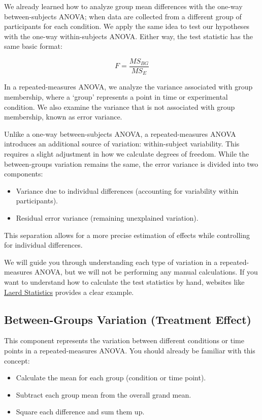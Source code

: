 \documentclass[
  letterpaper,
  DIV=11,
  numbers=noendperiod]{scrreprt}
\begin{document}
We already learned how to analyze group mean differences with the
one-way between-subjects ANOVA; when data are collected from a different
group of participants for each condition. We apply the same idea to test
our hypotheses with the one-way within-subjects ANOVA. Either way, the
test statistic has the same basic format:

\[
F = \frac{MS_{BG}}{MS_E}
\]

In a repeated-measures ANOVA, we analyze the variance associated with
group membership, where a `group' represents a point in time or
experimental condition. We also examine the variance that is not
associated with group membership, known as error variance.

Unlike a one-way between-subjects ANOVA, a repeated-measures ANOVA
introduces an additional source of variation: within-subject
variability. This requires a slight adjustment in how we calculate
degrees of freedom. While the between-groups variation remains the same,
the error variance is divided into two components:

\begin{itemize}
\item
  Variance due to individual differences (accounting for variability
  within participants).
\item
  Residual error variance (remaining unexplained variation).
\end{itemize}

This separation allows for a more precise estimation of effects while
controlling for individual differences.

We will guide you through understanding each type of variation in a
repeated-measures ANOVA, but we will not be performing any manual
calculations. If you want to understand how to calculate the test
statistics by hand, websites like
\href{https://statistics.laerd.com/statistical-guides/repeated-measures-anova-statistical-guide-2.php}{Laerd
Statistics} provides a clear example.

\subsection{Between-Groups Variation (Treatment
Effect)}\label{between-groups-variation-treatment-effect}

This component represents the variation between different conditions or
time points in a repeated-measures ANOVA. You should already be familiar
with this concept:

\begin{itemize}
\item
  Calculate the mean for each group (condition or time point).
\item
  Subtract each group mean from the overall grand mean.
\item
  Square each difference and sum them up.
\end{itemize}
\end{document}
